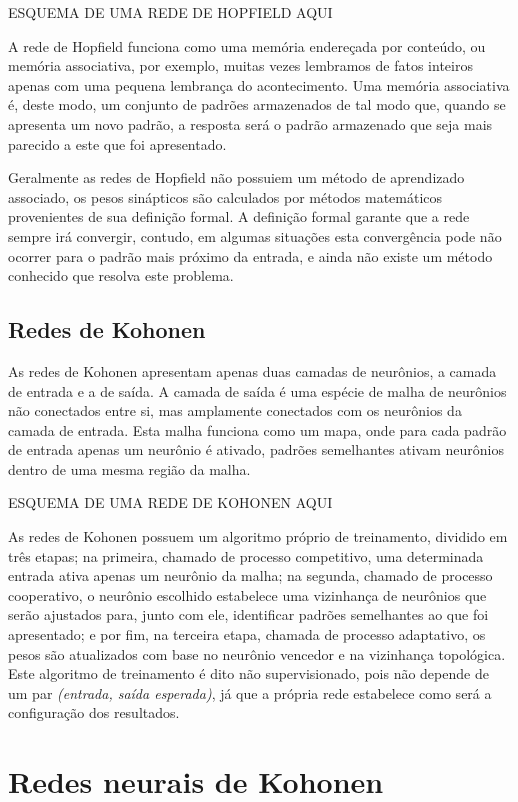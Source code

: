 ESQUEMA DE UMA REDE DE HOPFIELD AQUI

A rede de Hopfield funciona como uma memória endereçada por conteúdo, ou memória
associativa, por exemplo, muitas vezes lembramos de fatos inteiros apenas com uma
pequena lembrança do acontecimento. Uma memória associativa é, deste modo, um
conjunto de padrões armazenados de tal modo que, quando se apresenta um novo padrão,
a resposta será o padrão armazenado que seja mais parecido a este que foi apresentado.

Geralmente as redes de Hopfield não possuiem um método de aprendizado associado,
os pesos sinápticos são calculados por métodos matemáticos provenientes de sua
definição formal. A definição formal garante que a rede sempre irá convergir,
contudo, em algumas situações esta convergência pode não ocorrer para o padrão
mais próximo da entrada, e ainda não existe um método conhecido que resolva
este problema.

\subsection{Redes de Kohonen}

As redes de Kohonen apresentam apenas duas camadas de neurônios, a camada de
entrada e a de saída. A camada de saída é uma espécie de malha de neurônios não
conectados entre si, mas amplamente conectados com os neurônios da camada de
entrada. Esta malha funciona como um mapa, onde para cada padrão de entrada
apenas um neurônio é ativado, padrões semelhantes ativam neurônios dentro de
uma mesma região da malha.

ESQUEMA DE UMA REDE DE KOHONEN AQUI

As redes de Kohonen possuem um algoritmo próprio de treinamento, dividido em
três etapas; na primeira, chamado de processo competitivo, uma determinada entrada
ativa apenas um neurônio da malha; na segunda, chamado de processo cooperativo,
o neurônio escolhido estabelece uma vizinhança de neurônios que serão ajustados
para, junto com ele, identificar padrões semelhantes ao que foi apresentado; e
por fim, na terceira etapa, chamada de processo adaptativo, os pesos são
atualizados com base no neurônio vencedor e na vizinhança topológica. Este
algoritmo de treinamento é dito não supervisionado, pois não depende de um
par \textit{(entrada, saída esperada)}, já que a própria rede estabelece como
será a configuração dos resultados.

\section{Redes neurais de Kohonen}\label{sec:red_khn}

